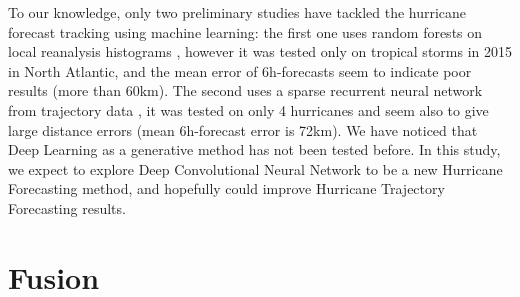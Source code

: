 To our knowledge, only two preliminary studies have tackled the hurricane forecast tracking using machine learning: the first one uses random forests on local reanalysis histograms \cite{liberge2011prevision}, however it was tested only on tropical storms in 2015 in North Atlantic, and the mean error of 6h-forecasts seem to indicate poor results (more than 60km). The second uses a sparse recurrent neural network from trajectory data \cite{moradi2016sparse}, it was tested on only 4 hurricanes and seem also to give large distance errors (mean 6h-forecast error is 72km). We have noticed that Deep Learning as a generative method has not been tested before. In this study, we expect to explore Deep Convolutional Neural Network to be a new Hurricane Forecasting method, and hopefully could improve Hurricane Trajectory Forecasting results.

\section{Fusion}


